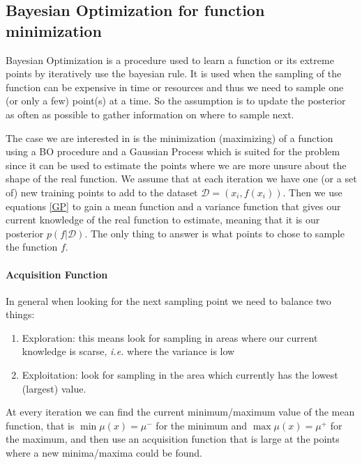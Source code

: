 \documentclass{article}
\begin{document}
\subsection{Bayesian Optimization for function minimization}
Bayesian Optimization is a procedure used to learn a function or its extreme points by iteratively use the bayesian rule. It is used when the sampling of the function can be expensive in time or resources and thus we need to sample one (or only a few) point(s) at a time. So the assumption is to update the posterior as often as possible to gather information on where to sample next. 

The case we are interested in is the minimization (maximizing) of a function using a BO procedure and a Gaussian Process which is suited for the problem since it can be used to estimate the points where we are more unsure about the shape of the real function. We assume that at each iteration we have one (or a set of) new training points to add to the dataset $\mathcal{D} = (x_i, f(x_i))$. Then we use equations \eqref{GP} to gain a mean function and a variance function that gives our current knowledge of the real function to estimate, meaning that it is our posterior $p(f | \mathcal{D})$. The only thing to answer is what points to chose to sample the function $f$. 

\paragraph{Acquisition Function}
In general when looking for the next sampling point we need to balance two things:
\begin{enumerate}
    \item Exploration: this means look for sampling in areas where our current knowledge is scarse, \textit{i.e.} where the variance is low
    \item Exploitation: look for sampling in the area which currently has the lowest (largest) value.
\end{enumerate}
At every iteration we can find the current minimum/maximum value of the mean function, that is $\min \mu(x) = \mu^-$ for the minimum and $\max \mu(x) = \mu^+$ for the maximum, and then use an acquisition function that is large at the points where a new minima/maxima could be found. 
\end{document}
